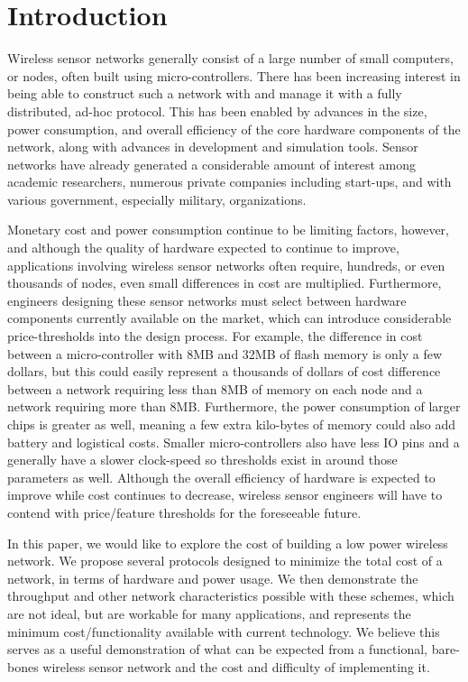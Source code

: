 \section{Introduction}

Wireless sensor networks generally consist of a large number of small computers, or nodes, often built using micro-controllers.
There has been increasing interest in being able to construct such a network with and manage it with a fully distributed,
ad-hoc protocol.  This has been enabled by advances in the size, power consumption, and overall efficiency of the
core hardware components of the network, along with advances in development and simulation tools.  Sensor networks have
already generated a considerable amount of interest among academic researchers, numerous private companies including
start-ups, and with various government, especially military, organizations.

Monetary cost and power consumption continue to be limiting factors, however, and although the quality of hardware expected to
continue to improve,
applications involving wireless sensor networks often require, hundreds, or even thousands of nodes,
even small differences in cost are multiplied.
Furthermore, engineers designing these sensor networks must select between hardware components currently available on
the market, which can introduce considerable price-thresholds into the design process.  For example, the difference in cost
between a micro-controller with 8MB and 32MB of flash memory is only a few dollars, but this could easily represent a
thousands of dollars of cost difference between a network requiring less than 8MB of memory on each node and a network
requiring more than 8MB.  Furthermore, the power consumption of larger chips is greater as well, meaning a few extra
kilo-bytes of memory could also add battery and logistical costs.  Smaller micro-controllers also have less IO pins and
a generally have a slower clock-speed so thresholds exist in around those parameters as well.  Although the overall efficiency of
hardware is expected to improve while cost continues to decrease, wireless sensor engineers will have to contend with price/feature
thresholds for the foreseeable future.

In this paper, we would like to explore the cost of building a low power wireless network.  We propose several protocols
designed to minimize the total cost of a network, in terms of hardware and power usage.  We then demonstrate the throughput and
other network characteristics possible with these schemes, which are not ideal, but are workable for many applications, and
represents the minimum cost/functionality available with current technology.  We believe this serves as a useful demonstration
of what can be expected from a functional, bare-bones wireless sensor network and the cost and difficulty of implementing it.

